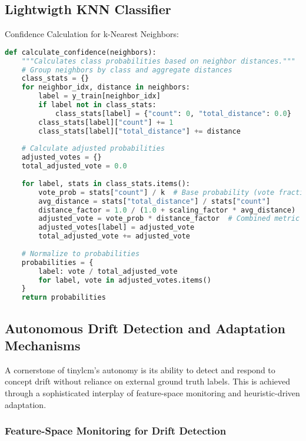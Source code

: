 \subsection{Lightwigth KNN Classifier}
\label{ssec:LightweightKNN}

Confidence Calculation for k-Nearest Neighbors:

\begin{lstlisting}[captionpos=b, language=Python, commentstyle=\color{blue}\itshape, caption=Distance-weighted confidence calculation for k-NN predictions,label=lst:confidenceCalc]
def calculate_confidence(neighbors):
    """Calculates class probabilities based on neighbor distances."""
    # Group neighbors by class and aggregate distances
    class_stats = {}
    for neighbor_idx, distance in neighbors:
        label = y_train[neighbor_idx]
        if label not in class_stats:
            class_stats[label] = {"count": 0, "total_distance": 0.0}
        class_stats[label]["count"] += 1
        class_stats[label]["total_distance"] += distance
    
    # Calculate adjusted probabilities
    adjusted_votes = {}
    total_adjusted_vote = 0.0
    
    for label, stats in class_stats.items():
        vote_prob = stats["count"] / k  # Base probability (vote fraction)
        avg_distance = stats["total_distance"] / stats["count"]
        distance_factor = 1.0 / (1.0 + scaling_factor * avg_distance)  # Penalize distance
        adjusted_vote = vote_prob * distance_factor  # Combined metric
        adjusted_votes[label] = adjusted_vote
        total_adjusted_vote += adjusted_vote
    
    # Normalize to probabilities
    probabilities = {
        label: vote / total_adjusted_vote 
        for label, vote in adjusted_votes.items()
    }
    return probabilities
\end{lstlisting}

\subsection{Autonomous Drift Detection and Adaptation Mechanisms}
\label{ssec:tinylcm_drift_adaptation}

A cornerstone of \gls{tinylcm}'s autonomy is its ability to detect and respond to concept drift without reliance on external ground truth labels. This is achieved through a sophisticated interplay of feature-space monitoring and heuristic-driven adaptation.

\subsubsection{Feature-Space Monitoring for Drift Detection}
\label{sssec:tinylcm_drift_theory}

